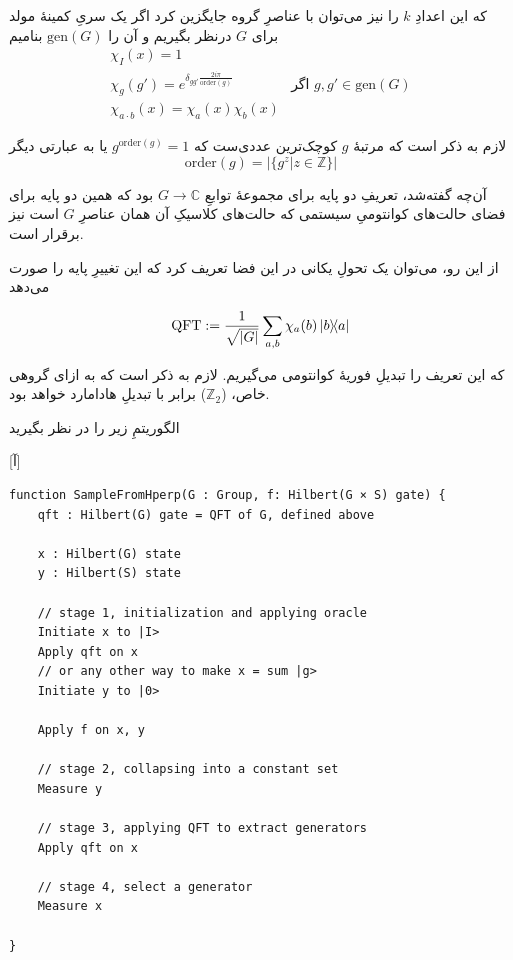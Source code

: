 که این اعدادِ \(k\) را نیز می‌توان با عناصرِ گروه جایگزین کرد اگر یک سریِ کمینهٔ مولد برای \(G\) درنظر بگیریم و آن را 
\(\mathrm{gen}(G)\)
بنامیم
\begin{eqnarray}
\chi_I(x) = 1 \\
\chi_g(g') = e^{\delta_{gg'}\frac{2i\pi}{\mathrm{order}(g)}} & \text{اگر \(g, g' \in \mathrm{gen}(G)\)} \\
\chi_{a \cdot b}(x) = \chi_a(x) \chi_b(x) 
\end{eqnarray}

لازم به ذکر است که مرتبهٔ \(g\) کوچک‌ترین عددی‌ست که \(g^{\mathrm{order}(g)} = 1\) یا به عبارتی دیگر
\begin{equation}
    \mathrm{order}(g) = |\{ g^z | z \in \mathbb{Z}\}|
\end{equation}

آن‌چه گفته‌شد، تعریفِ دو پایه برای مجموعهٔ توابعِ \(G \to \mathbb{C}\) بود که همین دو پایه برای فضای حالت‌های کوانتومیِ سیستمی که حالت‌های کلاسیکِ آن همان عناصرِ \(G\) است نیز برقرار است.

از این رو، می‌توان یک تحولِ یکانی در این فضا تعریف کرد که این تغییرِ پایه را صورت می‌دهد

\begin{equation}
    \mathrm{QFT} := \frac{1}{\sqrt{\abs{G}}} \sum_{a, b} \chi_a(b) \dyad{b}{a}  
\end{equation}

که این تعریف را تبدیلِ فوریهٔ کوانتومی می‌گیریم. لازم به ذکر است که به ازای گروهی خاص، (\(\mathbb{Z}_2\)) برابر با تبدیلِ هادامارد خواهد بود.

الگوریتمِ زیر را در نظر بگیرید

[آ]

\begin{latin}
\begin{lstlisting}
function SampleFromHperp(G : Group, f: Hilbert(G × S) gate) {
    qft : Hilbert(G) gate = QFT of G, defined above
    
    x : Hilbert(G) state
    y : Hilbert(S) state
    
    // stage 1, initialization and applying oracle
    Initiate x to |I>
    Apply qft on x
    // or any other way to make x = sum |g>
    Initiate y to |0>
    
    Apply f on x, y
    
    // stage 2, collapsing into a constant set
    Measure y
    
    // stage 3, applying QFT to extract generators
    Apply qft on x
    
    // stage 4, select a generator
    Measure x
     
}
\end{lstlisting}
\end{latin}


